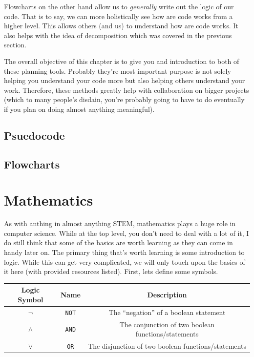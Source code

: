 \documentclass[12pt,a4paper]{book}
\begin{document}
			Flowcharts on the other hand allow us to \textit{generally} write out the logic of our code. That is to say, we can more holistically see how are code works from a higher level. This allows others (and us) to understand how are code works. It also helps with the idea of decomposition which was covered in the previous section.
			
			The overall objective of this chapter is to give you and introduction to both of these planning tools. Probably they're most important purpose is not solely helping you understand your code more but also helping others understand your work. Therefore, these methods greatly help with collaboration on bigger projects (which to many people's disdain, you're probably going to have to do eventually if you plan on doing almost anything meaningful).
			
			\subsection{Psuedocode} \label{sec:psuedocode}
			
			\subsection{Flowcharts} \label{sec:flowchart}
				
		\section{Mathematics}
			As with anthing in almost anything STEM, mathematics plays a huge role in computer science. While at the top level, you don't need to deal with a lot of it, I do still think that some of the basics are worth learning as they can come in handy later on. The primary thing that's worth learning is some introduction to logic. While this can get very complicated, we will only touch upon the basics of it here (with provided resources listed). First, lets define some symbols. 
			
			\begin{table}[H]
				\centering
				\begin{tabular}{c|c|c}
					Logic Symbol & Name & Description \\
					\hline
					$\lnot$ & \texttt{NOT} & The ``negation'' of a boolean statement \\
					$\land$ & \texttt{AND} & The conjunction of two boolean functions/statements \\
					$\lor$ & \texttt{OR} & The disjunction of two boolean functions/statements
				\end{tabular}
			\end{table}
\end{document}
